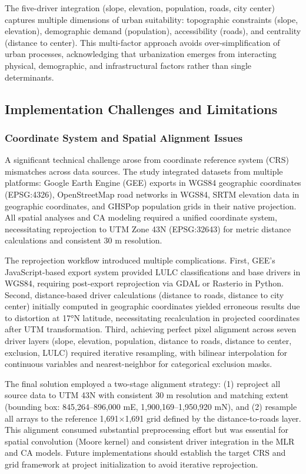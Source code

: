 \documentclass[12pt,a4paper]{article}
\begin{document}
The five-driver integration (slope, elevation, population, roads, city center) captures multiple dimensions of urban suitability: topographic constraints (slope, elevation), demographic demand (population), accessibility (roads), and centrality (distance to center). This multi-factor approach avoids over-simplification of urban processes, acknowledging that urbanization emerges from interacting physical, demographic, and infrastructural factors rather than single determinants.

\subsection{Implementation Challenges and Limitations}

\subsubsection{Coordinate System and Spatial Alignment Issues}

A significant technical challenge arose from coordinate reference system (CRS) mismatches across data sources. The study integrated datasets from multiple platforms: Google Earth Engine (GEE) exports in WGS84 geographic coordinates (EPSG:4326), OpenStreetMap road networks in WGS84, SRTM elevation data in geographic coordinates, and GHSPop population grids in their native projection. All spatial analyses and CA modeling required a unified coordinate system, necessitating reprojection to UTM Zone 43N (EPSG:32643) for metric distance calculations and consistent 30 m resolution.

The reprojection workflow introduced multiple complications. First, GEE's JavaScript-based export system provided LULC classifications and base drivers in WGS84, requiring post-export reprojection via GDAL or Rasterio in Python. Second, distance-based driver calculations (distance to roads, distance to city center) initially computed in geographic coordinates yielded erroneous results due to distortion at 17°N latitude, necessitating recalculation in projected coordinates after UTM transformation. Third, achieving perfect pixel alignment across seven driver layers (slope, elevation, population, distance to roads, distance to center, exclusion, LULC) required iterative resampling, with bilinear interpolation for continuous variables and nearest-neighbor for categorical exclusion masks.

The final solution employed a two-stage alignment strategy: (1) reproject all source data to UTM 43N with consistent 30 m resolution and matching extent (bounding box: 845,264--896,000 mE, 1,900,169--1,950,920 mN), and (2) resample all arrays to the reference 1,691$\times$1,691 grid defined by the distance-to-roads layer. This alignment consumed substantial preprocessing effort but was essential for spatial convolution (Moore kernel) and consistent driver integration in the MLR and CA models. Future implementations should establish the target CRS and grid framework at project initialization to avoid iterative reprojection.
\end{document}
